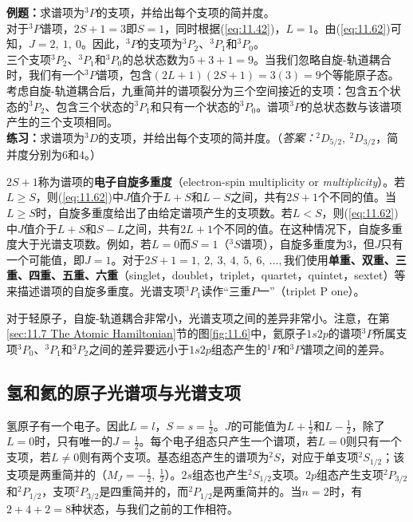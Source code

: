     \begin{examplebox}
        \textbf{例题：}求谱项为$^3P$的支项，并给出每个支项的简并度。
        \\

        对于$^3P$谱项，$2S+1=3$即$S=1$，同时根据(\ref{eq:11.42})，$L=1$。由(\ref{eq:11.62})可知，$J = 2,\:1,\:0$。因此，$^3P$的支项为$^3P_2$、$^3P_1$和$^3P_0$。\\
        三个支项$^3P_2$、$^3P_1$和$^3P_0$的总状态数为$5+3+1=9$。当我们忽略自旋-轨道耦合时，我们有一个$^3P$谱项，包含$\left(2L+1\right)\left(2S+1\right)=3\left(3\right)=9$个等能原子态。考虑自旋-轨道耦合后，九重简并的谱项裂分为三个空间接近的支项：包含五个状态的$^3P_2$、包含三个状态的$^3P_1$和只有一个状态的$^3P_0$。谱项$^3P$的总状态数与该谱项产生的三个支项相同。
        \\

        \textbf{练习：}求谱项为$^3D$的支项，并给出每个支项的简并度。（\textit{答案：}$^2D_{5/2},\:^2D_{3/2}$，简并度分别为$6$和$4$。）
    \end{examplebox}

    $2S+1$称为谱项的\textbf{电子自旋多重度}（electron-spin multiplicity or \textit{multiplicity}）。若$L \geq S$，则(\ref{eq:11.62})中$J$值介于$L+S$和$L-S$之间，共有$2S+1$个不同的值。当$L \geq S$时，自旋多重度给出了由给定谱项产生的支项数。若$L<S$，则(\ref{eq:11.62})中$J$值介于$L+S$和$S-L$之间，共有$2L+1$个不同的值。在这种情况下，自旋多重度大于光谱支项数。例如，若$L=0$而$S=1$（$^3S$谱项），自旋多重度为$3$，但$J$只有一个可能值，即$J=1$。对于$2S+1=1,\:2,\:3,\:4,\:5,\:6,\:\ldots,$我们使用\textbf{单重、双重、三重、四重、五重、六重}（singlet，doublet，triplet，quartet，quintet，sextet）等来描述谱项的自旋多重度。光谱支项$^3P_1$读作“三重$P$一”（triplet P one）。
    
    对于轻原子，自旋-轨道耦合非常小，光谱支项之间的差异非常小。注意，在第\ref{sec:11.7 The Atomic Hamiltonian}节的图\ref{fig:11.6}中，氦原子$1s2p$的谱项$^3P$所属支项$^3P_0$、$^3P_1$和$^3P_2$之间的差异要远小于$1s2p$组态产生的$^1P$和$^3P$谱项之间的差异。

\subsection*{氢和氦的原子光谱项与光谱支项}

    氢原子有一个电子。因此$L=l$，$S=s=\frac{1}{2}$。$J$的可能值为$L+\frac{1}{2}$和$L-\frac{1}{2}$，除了$L=0$时，只有唯一的$J=\frac{1}{2}$。每个电子组态只产生一个谱项，若$L=0$则只有一个支项，若$L \neq 0$则有两个支项。基态组态产生的谱项为$^2S$，对应于单支项$^2S_{1/2}$；该支项是两重简并的（$M_J = -\frac{1}{2},\:\frac{1}{2}$）。$2s$组态也产生$^2S_{1/2}$支项。$2p$组态产生支项$^2P_{3/2}$和$^2P_{1/2}$，支项$^2P_{3/2}$是四重简并的，而$^2P_{1/2}$是两重简并的。当$n=2$时，有$2+4+2=8$种状态，与我们之前的工作相符。

